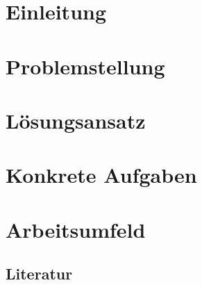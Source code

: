 




\tableofcontents
\newpage

\section{Einleitung}
\label{sec:einleitung}

\section{Problemstellung}
\label{sec:problemstellung}

\section{Lösungsansatz}
\label{sec:loesungsansatz}

\section{Konkrete Aufgaben}
\label{sec:konkrete_aufgaben}

\section{Arbeitsumfeld}
\label{sec:arbeitsumfeld}

  \subsection{Literatur}
  \label{ssec:literatur}
    \nocite{*}
    \printbibliography

